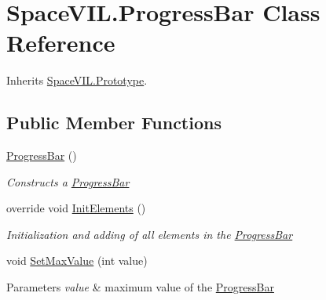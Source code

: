 \hypertarget{class_space_v_i_l_1_1_progress_bar}{}\section{Space\+V\+I\+L.\+Progress\+Bar Class Reference}
\label{class_space_v_i_l_1_1_progress_bar}


Inherits \mbox{\hyperlink{class_space_v_i_l_1_1_prototype}{Space\+V\+I\+L.\+Prototype}}.

\subsection*{Public Member Functions}
\begin{DoxyCompactItemize}
\item 
\mbox{\hyperlink{class_space_v_i_l_1_1_progress_bar_afaaadcd993c494fd34bff6bd0385faa5}{Progress\+Bar}} ()
\begin{DoxyCompactList}\small\item\em Constructs a \mbox{\hyperlink{class_space_v_i_l_1_1_progress_bar}{Progress\+Bar}} \end{DoxyCompactList}\item 
override void \mbox{\hyperlink{class_space_v_i_l_1_1_progress_bar_a61f9a8602172eebf205ed6eee8cb3e30}{Init\+Elements}} ()
\begin{DoxyCompactList}\small\item\em Initialization and adding of all elements in the \mbox{\hyperlink{class_space_v_i_l_1_1_progress_bar}{Progress\+Bar}} \end{DoxyCompactList}\item 
\mbox{\label{class_space_v_i_l_1_1_progress_bar_a396a56495a97bcbe649bdb3d514893bc}} 
void \mbox{\hyperlink{class_space_v_i_l_1_1_progress_bar_a396a56495a97bcbe649bdb3d514893bc}{Set\+Max\+Value}} (int value)
\begin{DoxyCompactList}\small\item\em 
\begin{DoxyParams}{Parameters}
{\em value} & maximum value of the \mbox{\hyperlink{class_space_v_i_l_1_1_progress_bar}{Progress\+Bar}} \\
\hline
\end{DoxyParams}
\end{DoxyCompactList}\item 
\mbox{\label{class_space_v_i_l_1_1_progress_bar_af32d45ea6d44af6139d6709f7256653a}} 

\end{DoxyCompactItemize}
